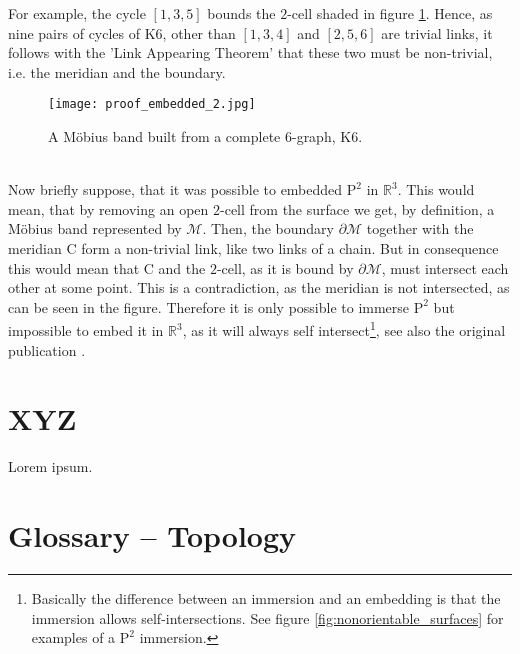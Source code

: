 For example, the cycle $[1,3,5]$ bounds the $2$-cell shaded in figure \ref{fig:proof_embedded_2}.
Hence, as nine pairs of cycles of $\mathrm{K}6$, other than $[1,3,4]$ and $[2,5,6]$ are trivial links, it follows with the 'Link Appearing Theorem' that these two must be non-trivial, i.e. the meridian and the boundary.
\begin{figure}[ht]
\centering
\texttt{[image: proof\_embedded\_2.jpg]}
\caption{A Möbius band built from a complete $6$-graph, $\mathrm{K}6$.}
\label{fig:proof_embedded_2}
\end{figure}\\
Now briefly suppose, that it was possible to embedded $\mathrm{P}^{2}$ in $\mathbb{R}^{3}$.
This would mean, that by removing an open $2$-cell from the surface we get, by definition, a Möbius band represented by $\mathcal{M}$.
Then, the boundary $\partial \mathcal{M}$ together with the meridian $\mathrm{C}$ form a non-trivial link, like two links of a chain.
But in consequence this would mean that $\mathrm{C}$ and the $2$-cell, as it is bound by $\partial \mathcal{M}$, must intersect each other at some point.
This is a contradiction, as the meridian is not intersected, as can be seen in the figure.
Therefore it is only possible to immerse $\mathrm{P}^{2}$ but impossible to embed it in $\mathbb{R}^{3}$, as it will always self intersect\footnote{ Basically the difference between an immersion and an embedding is that the immersion allows self-intersections. See figure \ref{fig:nonorientable_surfaces} for examples of a $\mathrm{P}^{2}$ immersion.}, see also the original publication \citep[][pp.862-864]{Maehara1993}.


\newpage
\vspace*{1ex}
\section{XYZ}
\label{appendix8}

Lorem ipsum.

\newpage
\section{Glossary -- Topology}
\label{appendix_glossary}


